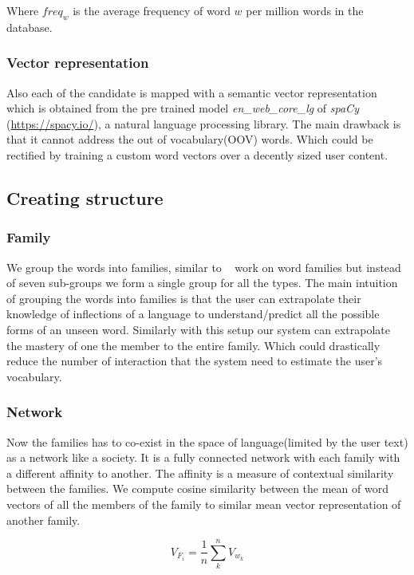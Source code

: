 \documentclass[11pt,a4paper]{article}
\begin{document}
Where ${freq_w}$ is the average frequency of word $w$ per million words in the
database.

\subsubsection{Vector representation}
Also each of the candidate is mapped with a semantic vector representation which
is obtained from the pre trained model \emph{en\_web\_core\_lg} of \emph{spaCy}
(\url{https://spacy.io/}), a natural language processing library. The main
drawback is that it cannot address the out of vocabulary(OOV) words. Which
could be rectified by training a custom word vectors over a decently sized user content.

\subsection{Creating structure}

\subsubsection{Family}
We group the words into families, similar to ~\citet{bauer1993word} work on word
families but instead of seven sub-groups we form a single group for all the types.
The main intuition of grouping the words into families is that the user can
extrapolate their knowledge of inflections of a language to understand/predict
all the possible forms of an unseen word. Similarly with this setup our system
can extrapolate the mastery of one the member to the entire family. Which could 
drastically reduce the number of interaction that the system need to estimate
the user's vocabulary.

\subsubsection{Network}
Now the families has to co-exist in the space of language(limited by the
user text) as a network like a society. It is a fully connected network with each
family with a different affinity to another. The affinity is a measure of
contextual similarity between the families. We compute cosine similarity 
between the mean of word vectors of all the members of the family to similar
mean vector representation of another family.

\begin{equation}
  V_{F_i} = \frac{1}{n} \sum_{k}^{n} V_{w_k}
\end{equation}
\end{document}
